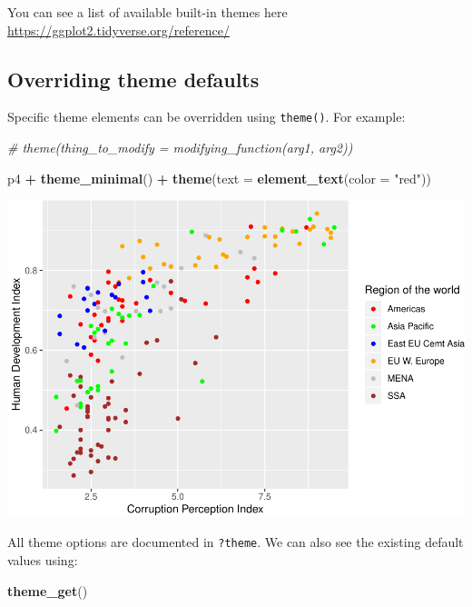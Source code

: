 \documentclass[
]{book}
\newenvironment{Shaded}{\begin{snugshade}}{\end{snugshade}}
\newcommand{\CommentTok}[1]{\textcolor[rgb]{0.56,0.35,0.01}{\textit{#1}}}
\newcommand{\DataTypeTok}[1]{\textcolor[rgb]{0.13,0.29,0.53}{#1}}
\newcommand{\KeywordTok}[1]{\textcolor[rgb]{0.13,0.29,0.53}{\textbf{#1}}}
\newcommand{\NormalTok}[1]{#1}
\newcommand{\OperatorTok}[1]{\textcolor[rgb]{0.81,0.36,0.00}{\textbf{#1}}}
\newcommand{\StringTok}[1]{\textcolor[rgb]{0.31,0.60,0.02}{#1}}
\begin{document}
You can see a list of available built-in themes here \url{https://ggplot2.tidyverse.org/reference/}

\hypertarget{overriding-theme-defaults}{%
\subsection{Overriding theme defaults}\label{overriding-theme-defaults}}

Specific theme elements can be overridden using \texttt{theme()}. For example:

\begin{Shaded}
\begin{Highlighting}[]
\CommentTok{\# theme(thing\_to\_modify = modifying\_function(arg1, arg2))}

\NormalTok{p4 }\OperatorTok{+}\StringTok{ }\KeywordTok{theme\_minimal}\NormalTok{() }\OperatorTok{+}
\StringTok{  }\KeywordTok{theme}\NormalTok{(}\DataTypeTok{text =} \KeywordTok{element\_text}\NormalTok{(}\DataTypeTok{color =} \StringTok{"red"}\NormalTok{))  }
\end{Highlighting}
\end{Shaded}

\includegraphics{R/Rgraphics/figures/unnamed-chunk-209-1.pdf}

All theme options are documented in \texttt{?theme}. We can also see the
existing default values using:

\begin{Shaded}
\begin{Highlighting}[]
\KeywordTok{theme\_get}\NormalTok{()}
\end{Highlighting}
\end{Shaded}
\end{document}

